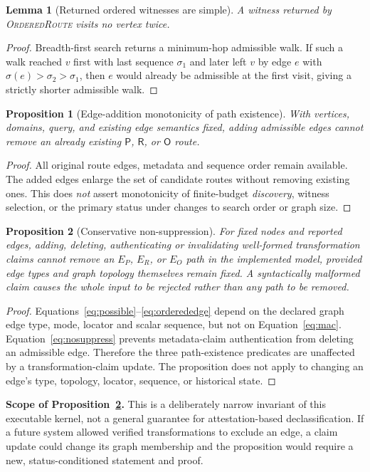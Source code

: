 \documentclass[11pt,letterpaper]{article}
\newtheorem{proposition}{Proposition}
\newtheorem{lemma}{Lemma}
\newcommand{\OO}{\mathsf{O}}
\newcommand{\RR}{\mathsf{R}}
\newcommand{\PP}{\mathsf{P}}
\begin{document}
\begin{lemma}[Returned ordered witnesses are simple]\label{lem:simple}
A witness returned by \textup{\textsc{OrderedRoute}} visits no vertex twice.
\end{lemma}
\begin{proof}
Breadth-first search returns a minimum-hop admissible walk. If such a walk reached \(v\) first with last sequence \(\sigma_1\) and later left \(v\) by edge \(e\) with \(\sigma(e)>\sigma_2>\sigma_1\), then \(e\) would already be admissible at the first visit, giving a strictly shorter admissible walk.
\end{proof}

\begin{proposition}[Edge-addition monotonicity of path existence]
With vertices, domains, query, and existing edge semantics fixed, adding admissible edges cannot remove an already existing \(\PP\), \(\RR\), or \(\OO\) route.
\end{proposition}
\begin{proof}
All original route edges, metadata and sequence order remain available. The added edges enlarge the set of candidate routes without removing existing ones. This does \emph{not} assert monotonicity of finite-budget \emph{discovery}, witness selection, or the primary status under changes to search order or graph size.
\end{proof}

\begin{proposition}[Conservative non-suppression]\label{prop:nonsuppress}
For fixed nodes and reported edges, adding, deleting, authenticating or invalidating well-formed transformation \emph{claims} cannot remove an \(E_P\), \(E_R\), or \(E_O\) path in the implemented model, provided edge types and graph topology themselves remain fixed. A syntactically malformed claim causes the whole input to be rejected rather than any path to be removed.
\end{proposition}
\begin{proof}
Equations~\eqref{eq:possible}--\eqref{eq:orderededge} depend on the declared graph edge type, mode, locator and scalar sequence, but not on Equation~\eqref{eq:mac}. Equation~\eqref{eq:nosuppress} prevents metadata-claim authentication from deleting an admissible edge. Therefore the three path-existence predicates are unaffected by a transformation-claim update. The proposition does not apply to changing an edge's type, topology, locator, sequence, or historical state.
\end{proof}
\textbf{Scope of Proposition~\ref{prop:nonsuppress}.} This is a deliberately narrow invariant of this executable kernel, not a general guarantee for attestation-based declassification. If a future system allowed verified transformations to exclude an edge, a claim update could change its graph membership and the proposition would require a new, status-conditioned statement and proof.
\end{document}
